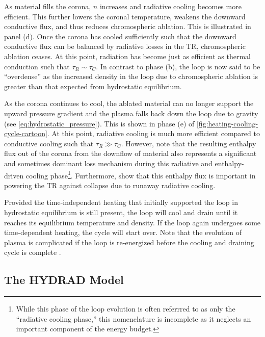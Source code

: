 As material fills the corona, $n$ increases and radiative cooling becomes more efficient. This further lowers the coronal temperature, weakens the downward conductive flux, and thus reduces chromospheric ablation. This is illustrated in panel (d). Once the corona has cooled sufficiently such that the downward conductive flux can be balanced by radiative losses in the TR, chromospheric ablation ceases. At this point, radiation has become just as efficient as thermal conduction such that $\tau_R\sim\tau_C$. In contrast to phase (b), the loop is now said to be ``overdense'' as the increased density in the loop due to chromospheric ablation is greater than that expected from hydrostatic equilibrium.

As the corona continues to cool, the ablated material can no longer support the upward pressure gradient and the plasma falls back down the loop due to gravity (see \autoref{eq:hydrostatic_pressure}). This is shown in phase (e) of \autoref{fig:heating-cooling-cycle-cartoon}. At this point, radiative cooling is much more efficient compared to conductive cooling such that $\tau_R\gg\tau_C$. However, \citep{bradshaw_cooling_2010} note that the resulting enthalpy flux out of the corona from the downflow of material also represents a significant and sometimes dominant loss mechanism during this radiative and enthalpy-driven cooling phase\footnote{While this phase of the loop evolution is often referrred to as only the ``radiative cooling phase,'' this nomenclature is incomplete as it neglects an important component of the energy budget.}. Furthermore, \citep{bradshaw_reinterpretation_2008,bradshaw_cooling_2010} show that this enthalpy flux is important in powering the TR against collapse due to runaway radiative cooling.

Provided the time-independent heating that initially supported the loop in hydrostatic equilibrium is still present, the loop will cool and drain until it reaches its equilibrium temperature and density. If the loop again undergoes some time-dependent heating, the cycle will start over. Note that the evolution of plasma is complicated if the loop is re-energized before the cooling and draining cycle is complete \citep[e.g.][or \autoref{sec:modeling-observables:heating}]{cargill_active_2014,barnes_inference_2016-1}.

\subsection{The HYDRAD Model}\label{sec:hydrad}

